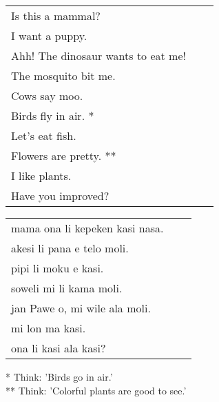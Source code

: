 \begin{supertabular}{p{5,5cm}|ll}
    Is this a mammal?                  &  & \\
    I want a puppy.                    &  & \\
    Ahh! The dinosaur wants to eat me! &  & \\
    The mosquito bit me.               &  & \\
    Cows say moo.                      &  & \\
    Birds fly in air. *                &  & \\
    Let's eat fish.                    &  & \\
    Flowers are pretty. **             &  & \\
    I like plants.                     &  & \\
    Have you improved?                 &  & \\
\end{supertabular}

\begin{supertabular}{p{5,5cm}|ll}
    mama ona li kepeken kasi nasa. &  & \\
    akesi li pana e telo moli.     &  & \\
    pipi li moku e kasi.           &  & \\
    soweli mi li kama moli.        &  & \\
    jan Pawe o, mi wile ala moli.  &  & \\
    mi lon ma kasi.                &  & \\
    ona li kasi ala kasi?          &  & \\
\end{supertabular}

* Think: 'Birds go in air.' \\
** Think: 'Colorful plants are good to see.'
